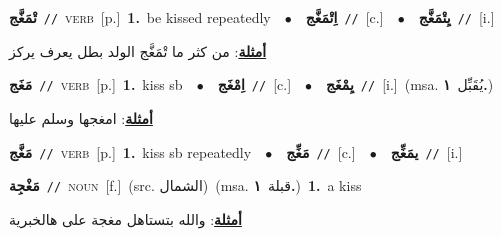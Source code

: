\documentclass[10pt,a4paper,twoside]{article} %
\begin{document}
\begin{multicols}{2}
{\setlength\topsep{0pt}\textbf{\foreignlanguage{arabic}{تْمَغَّج}}\ {\color{gray}\texttt{//}\color{black}}\ \textsc{verb}\ [p.]\ \textbf{1.}~be kissed repeatedly\ \ $\bullet$\ \ \setlength\topsep{0pt}\textbf{\foreignlanguage{arabic}{اِتْمَغَّج}}\ {\color{gray}\texttt{//}\color{black}}\ [c.]\ \ $\bullet$\ \ \setlength\topsep{0pt}\textbf{\foreignlanguage{arabic}{يِتْمَغَّج}}\ {\color{gray}\texttt{//}\color{black}}\ [i.]\  \begin{flushright}\color{gray}\foreignlanguage{arabic}{\textbf{\underline{\foreignlanguage{arabic}{أمثلة}}}: من كثر ما تْمَغَّج الولد بطل يعرف يركز}\end{flushright}\color{black}} \vspace{2mm}

{\setlength\topsep{0pt}\textbf{\foreignlanguage{arabic}{مَغَج}}\ {\color{gray}\texttt{//}\color{black}}\ \textsc{verb}\ [p.]\ \textbf{1.}~kiss sb\ \ $\bullet$\ \ \setlength\topsep{0pt}\textbf{\foreignlanguage{arabic}{اِمْغَج}}\ {\color{gray}\texttt{//}\color{black}}\ [c.]\ \ $\bullet$\ \ \setlength\topsep{0pt}\textbf{\foreignlanguage{arabic}{يِمْغَج}}\ {\color{gray}\texttt{//}\color{black}}\ [i.]\ \color{gray}(msa. \foreignlanguage{arabic}{يُقَبِّل}~\foreignlanguage{arabic}{\textbf{١.}})\color{black}\  \begin{flushright}\color{gray}\foreignlanguage{arabic}{\textbf{\underline{\foreignlanguage{arabic}{أمثلة}}}: امغجها وسلم عليها}\end{flushright}\color{black}} \vspace{2mm}

{\setlength\topsep{0pt}\textbf{\foreignlanguage{arabic}{مَغَّج}}\ {\color{gray}\texttt{//}\color{black}}\ \textsc{verb}\ [p.]\ \textbf{1.}~kiss sb repeatedly\ \ $\bullet$\ \ \setlength\topsep{0pt}\textbf{\foreignlanguage{arabic}{مَغِّج}}\ {\color{gray}\texttt{//}\color{black}}\ [c.]\ \ $\bullet$\ \ \setlength\topsep{0pt}\textbf{\foreignlanguage{arabic}{يمَغِّج}}\ {\color{gray}\texttt{//}\color{black}}\ [i.]\ } \vspace{2mm}

{\setlength\topsep{0pt}\textbf{\foreignlanguage{arabic}{مَغْجِة}}\ {\color{gray}\texttt{//}\color{black}}\ \textsc{noun}\ [f.]\ (src. \color{gray}\foreignlanguage{arabic}{الشمال}\color{black})\ \color{gray}(msa. \foreignlanguage{arabic}{قبلة}~\foreignlanguage{arabic}{\textbf{١.}})\color{black}\ \textbf{1.}~a kiss\  \begin{flushright}\color{gray}\foreignlanguage{arabic}{\textbf{\underline{\foreignlanguage{arabic}{أمثلة}}}: والله بتستاهل مغجة على هالخبرية}\end{flushright}\color{black}} \vspace{2mm}


\end{multicols}
\end{document}
